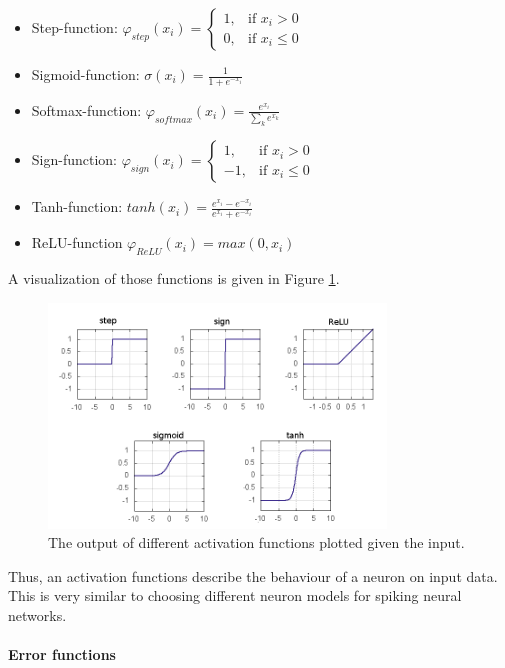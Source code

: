 \begin{itemize}
	\item Step-function: $\varphi_{step}(x_i) = \begin{cases} 1, & \text{if  } x_i > 0 \\ 0, & \text{if  } x_i \le 0  \end{cases}$
	\item Sigmoid-function: $\sigma(x_i) = \frac{1}{1 + e^{-x_i}}$ 
	\item Softmax-function: $\varphi_{softmax}(x_i) = \frac{e^{x_i}}{\sum_k e^{x_k}}$ 
	\item Sign-function: $\varphi_{sign}(x_i) = \begin{cases} 1, & \text{if  } x_i > 0 \\ -1, & \text{if  } x_i \le 0  \end{cases}$
	\item Tanh-function: $tanh(x_i) = \frac{e^{x_i} - e^{-x_i}}{e^{x_i} + e^{-x_i}}$
	\item ReLU-function $\varphi_{ReLU}(x_i) = max(0, x_i)$
\end{itemize}

A visualization of those functions is given in Figure \ref{fig:activations}.

\begin{figure}
	\centering
    	\includegraphics[width=0.8\textwidth]{imgs/act_fun.png} 
    \caption{The output of different activation functions plotted given the input.}
	\label{fig:activations}
\end{figure}

Thus, an activation functions describe the behaviour of a neuron on input data.
This is very similar to choosing different neuron models for spiking neural networks.


\paragraph{Error functions} \label{c:mlperr}

